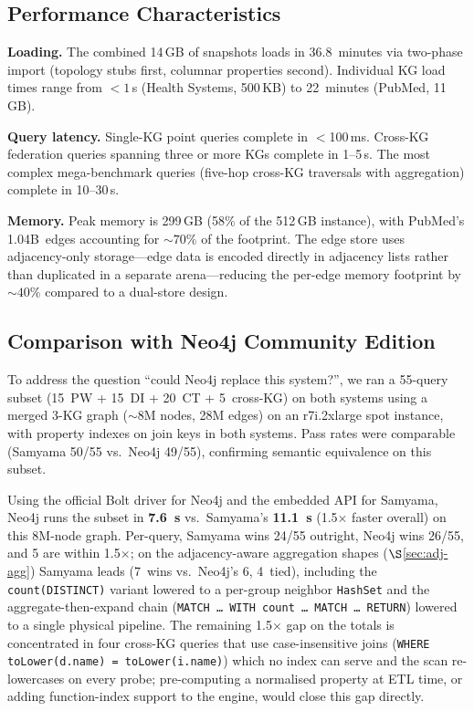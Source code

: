 \documentclass[runningheads]{llncs}
\begin{document}
\subsection{Performance Characteristics}

\noindent\textbf{Loading.}
The combined 14\,GB of snapshots loads in 36.8~minutes via
two-phase import (topology stubs first, columnar properties second).
Individual KG load times range from $<1$\,s (Health Systems, 500\,KB)
to 22~minutes (PubMed, 11\,GB).

\smallskip\noindent\textbf{Query latency.}
Single-KG point queries complete in $<$100\,ms.  Cross-KG
federation queries spanning three or more KGs complete in
1--5\,s.  The most complex mega-benchmark queries (five-hop
cross-KG traversals with aggregation) complete in 10--30\,s.

\smallskip\noindent\textbf{Memory.}
Peak memory is 299\,GB (58\% of the 512\,GB instance), with
PubMed's 1.04B~edges accounting for ${\sim}70\%$ of the footprint.
The edge store uses adjacency-only storage---edge data is encoded
directly in adjacency lists rather than duplicated in a separate
arena---reducing the per-edge memory footprint by ${\sim}40\%$
compared to a dual-store design.

\subsection{Comparison with Neo4j Community Edition}\label{sec:neo4j-baseline}

To address the question ``could Neo4j replace this system?'', we
ran a 55-query subset (15~PW + 15~DI + 20~CT + 5~cross-KG) on both
systems using a merged 3-KG graph (${\sim}$8M nodes, 28M edges) on
an r7i.2xlarge spot instance, with property indexes on join keys in
both systems.  Pass rates were comparable (Samyama 50/55 vs.\ Neo4j
49/55), confirming semantic equivalence on this subset.

Using the official Bolt driver for Neo4j and the embedded API for
Samyama, Neo4j runs the subset in \textbf{7.6~s} vs.\ Samyama's
\textbf{11.1~s} (1.5$\times$ faster overall) on this 8M-node graph.
Per-query, Samyama wins 24/55 outright, Neo4j wins 26/55, and 5
are within 1.5$\times$; on the adjacency-aware aggregation shapes
($\S$\ref{sec:adj-agg}) Samyama leads (7~wins vs.\ Neo4j's 6,
4~tied), including the \texttt{count(DISTINCT)} variant lowered
to a per-group neighbor \texttt{HashSet} and the
aggregate-then-expand chain (\texttt{MATCH \dots\ WITH count
\dots\ MATCH \dots\ RETURN}) lowered to a single physical
pipeline.  The remaining 1.5$\times$ gap on the totals is
concentrated in four cross-KG queries that use case-insensitive
joins (\texttt{WHERE toLower(d.name) = toLower(i.name)}) which no
index can serve and the scan re-lowercases on every probe;
pre-computing a normalised property at ETL time, or adding
function-index support to the engine, would close this gap
directly.
\end{document}
